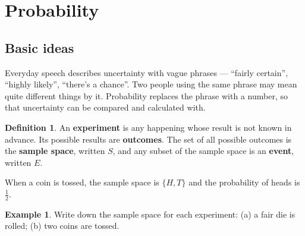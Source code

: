 \documentclass[11pt,a4paper]{article}
\theoremstyle{definition}
\newtheorem{definition}[thm]{Definition}
\newtheorem{example}[thm]{Example}
\begin{document}
\section{Probability}

\subsection{Basic ideas}

Everyday speech describes uncertainty with vague phrases --- ``fairly certain'',
``highly likely'', ``there's a chance''. Two people using the same phrase may mean quite
different things by it. Probability replaces the phrase with a number, so that
uncertainty can be compared and calculated with.

\begin{definition}
An \textbf{experiment} is any happening whose result is not known in advance. Its
possible results are \textbf{outcomes}. The set of all possible outcomes is the
\textbf{sample space}, written $S$, and any subset of the sample space is an
\textbf{event}, written $E$.
\end{definition}

When a coin is tossed, the sample space is $\{H,T\}$ and the probability of heads is
$\frac{1}{2}$.

\begin{example}
Write down the sample space for each experiment: \quad (a) a fair die is rolled; \quad
(b) two coins are tossed.
\end{example}
\end{document}
